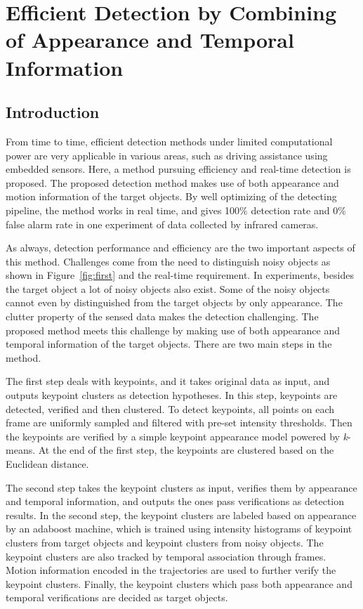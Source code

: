 \chapter{Efficient Detection by Combining of Appearance and Temporal Information }
\label{chp3}

\section{Introduction}

From time to time, efficient detection methods under limited computational power are very applicable in various areas, such as driving assistance using embedded sensors. Here, a method pursuing efficiency and real-time detection is proposed.
The proposed detection method makes use of both
appearance and motion information of the target objects. By well optimizing of the detecting pipeline, the
method works in real time, and gives 100\% detection rate and 0\% false alarm rate in one experiment of data collected by infrared cameras.

As always, detection performance and efficiency are the two important aspects of this method. Challenges come from the need to distinguish noisy objects as shown in Figure~\ref{fig:first} and the real-time requirement. In experiments, besides the target object a lot of noisy objects also exist. Some of the noisy objects cannot even by distinguished from the target objects by only appearance.  The clutter property of the sensed data makes the detection challenging. The proposed method meets this challenge by making use of both appearance and temporal information of the target objects. There are two main steps in the method.

The first step deals with keypoints, and  it takes original data as input, and outputs keypoint clusters as detection hypotheses. In this step, keypoints are detected, verified and then clustered. To detect keypoints, all points on each frame are uniformly sampled and filtered with pre-set intensity thresholds.  Then the keypoints are verified by a simple keypoint appearance model   powered by \emph{k}-means. At the end of the first step, the keypoints are clustered based on the Euclidean distance.

The second step takes the keypoint clusters as input, verifies them by appearance and temporal information, and outputs the ones pass verifications as detection results. In the second step, the keypoint clusters are labeled based on appearance by an adaboost machine, which is trained using intensity histograms of keypoint clusters from target objects and keypoint clusters from noisy objects. The keypoint clusters are also tracked by temporal association through frames. Motion information encoded in the trajectories are used to further verify the keypoint clusters. Finally, the keypoint clusters which pass both appearance and temporal verifications are decided as target objects.

